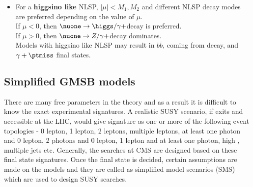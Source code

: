 \begin{itemize}
\item For a \textbf{higgsino like} NLSP, $|\mu| < M_1,M_2$ and different NLSP decay modes are preferred depending on the value of $\mu$.\\
If $\mu < 0$, then $\nuone \rightarrow \higgs/\gamma + $\grav decay is preferred.\\
If $\mu > 0$, then $\nuone \rightarrow Z/\gamma + $\grav decay dominates.\\
Models with higgsino like NLSP may result in $b\bar{b}$, coming from \higgs decay, and $\gamma+\ptmiss$ final states.
\end{itemize}

\subsection{Simplified GMSB models}\label{sec:SMSgmsb}
There are many free parameters in the theory and as a result it is difficult to know the exact experimental signatures.
A realistic SUSY scenario, if exits and accessible at the LHC, would give signature as one or more of the following event topologies - 
0 lepton, 1 lepton, 2 leptons, multiple leptons, at least one photon and 0 lepton, 2 photons and 0 lepton, 1 lepton 
and at least one photon, high \ptmiss, multiple jets etc.
Generally, the searches at CMS are designed based on these final state signatures. Once the final state is decided, certain
assumptions are made on the models and they are called as simplified model scenarios (SMS) 
\cite{bib-sms-1,bib-sms-2,bib-sms-3,bib-sms-4,Chatrchyan:2013sza} which are used to design SUSY searches.

